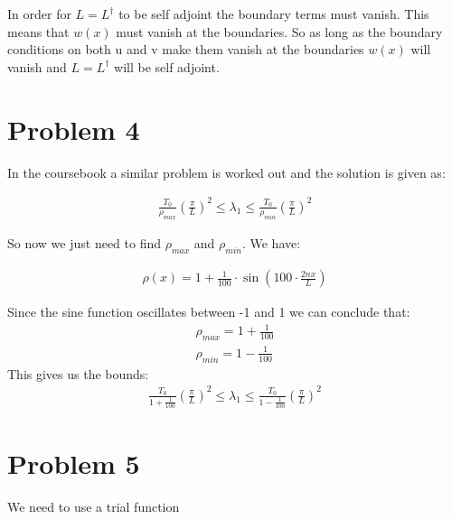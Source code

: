 \documentclass[a4paper]{article}
\begin{document}
In order for $L = L^\dagger$ to be self adjoint the boundary terms must vanish. This means that $w(x)$ must vanish at the boundaries. So as long as the boundary conditions on both u and v make them vanish at the boundaries $w(x)$ will vanish and $L = L^\dagger$ will be self adjoint.

\section*{Problem 4}

In the coursebook a similar problem is worked out and the solution is given as:

\begin{align*}
    \frac{T_0}{\rho_{max}}\left(\frac{\pi}{L}\right)^2 \leq \lambda_1 \leq \frac{T_0}{\rho_{min}} \left(\frac{\pi}{L}\right)^2
\end{align*}

So now we just need to find $\rho_{max}$ and $\rho_{min}$. We have:

\begin{align*}
    \rho(x) = 1 + \frac{1}{100} \cdot \sin\left( 100 \cdot \frac{2nx}{L} \right)
\end{align*}

Since the sine function oscillates between -1 and 1 we can conclude that:
\begin{align*}
    \rho_{max} = 1 + \frac{1}{100} \\
    \rho_{min} = 1 - \frac{1}{100}
\end{align*}
This gives us the bounds:
\begin{align*}
    \frac{T_0}{1 + \frac{1}{100}}\left(\frac{\pi}{L}\right)^2 \leq \lambda_1 \leq \frac{T_0}{1 - \frac{1}{100}} \left(\frac{\pi}{L}\right)^2
\end{align*}

\section*{Problem 5}

We need to use a trial function 
\end{document}
